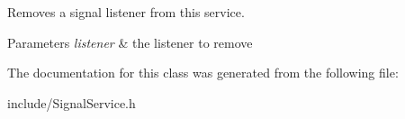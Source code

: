 Removes a signal listener from this service.


\begin{DoxyParams}{Parameters}
{\em listener} & the listener to remove \\
\hline
\end{DoxyParams}


The documentation for this class was generated from the following file\+:\begin{DoxyCompactItemize}
\item 
include/Signal\+Service.\+h\end{DoxyCompactItemize}
